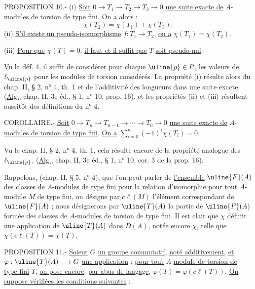 PROPOSITION 10.- (i) \uline{Soit} $0\longrightarrow T_1\longrightarrow T_2\longrightarrow T_3\longrightarrow0$ \uline{une suite exacte de} $A$-\uline{modules de torsion de type fini}. \uline{On a alors} :
\[\chi(T_2)=\chi(T_1)+\chi(T_3).\]
(ii) \uline{S'il existe un pseudo-isomorphisme} $f:T_1\longrightarrow T_2$, \uline{on a} $\chi(T_1)=\chi(T_2)$.

(iii) \uline{Pour que} $\chi(T)=0$, \uline{il faut et il suffit que} $T$ \uline{soit pseudo-nul}.

Vu la déf. 4, il suffit de considérer pour chaque $\uline{p}\in P$, les valeurs de $\ell_{\uline{p}}$ pour les modules de torsion considérés. La propriété (i) résulte alors du chap. II, § 2, n° 4, th. 1 et de l'additivité des longueurs dans une suite exacte, (\uline{Alg.}, chap. II, 3e éd., § 1, n° 10, prop. 16), et les propriétés (ii) et (iii) résultent aussitôt des définitions du n° 4.

COROLLAIRE.- \uline{Soit} $0\longrightarrow T_n\longrightarrow T_{n-1}\longrightarrow\cdots\longrightarrow T_0\longrightarrow0$ \uline{une suite exacte de} $A$-\uline{modules de torsion de type fini}. \uline{On a} $\sum_{i=0}^n(-1)^i\chi(T_i)=0$.

Vu le chap. II, § 2, n° 4, th. 1, cela résulte encore de la propriété analogue des $\ell_{\uline{p}}$, (\uline{Alg.}, chap. II, 3e éd., § 1, n° 10, cor. 3 de la prop. 16).

Rappelons, (chap. II, § 5, n° 4), que l'on peut parler de \uline{l'ensemble} $\uline{F}(A)$ \uline{des classes de} $A$-\uline{modules de type fini} pour la relation d'isomorphie pour tout $A$-module $M$ de type fini, on désigne par $c\ell(M)$ l'élément correspondant de $\uline{F}(A)$ ; nous désignerons par $\uline{T}(A)$ la partie de $\uline{F}(A)$ formée des classes de $A$-modules de torsion de type fini. Il est clair que $\chi$ définit une application de $\uline{T}(A)$ dans $D(A)$, notée encore $\chi$, telle que $\chi(c\ell(T))=\chi(T)$.

PROPOSITION 11.- \uline{Soient} $G$ \uline{un groupe commutatif}, \uline{noté additivement}, \uline{et} $\varphi:\uline{T}(A)\longrightarrow G$ \uline{une application} ; \uline{pour tout} $A$-\uline{module de torsion de type fini} $T$, \uline{on pose encore}, \uline{par abus de langage}, $\varphi(T)=\varphi(c\ell(T))$. \uline{On suppose vérifiées les conditions suivantes} :

